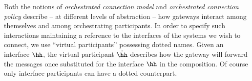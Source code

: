 %		  
%		  

Both the notions of {\em orchestrated connection model} and {\em orchestrated connection policy}
describe -- at different levels of abstraction -- how gateways interact among themselves and among orchestrating participants.
In order to specify such interactions maintaining a reference to the interfaces of the systems 
we wish to connect,
we use ``virtual participants'' possessing dotted names. Given an interface $\hh$, the
virtual participant $\dot\hh$ describes how the gateway will forward the messages
once substituted for the interface $\hh$ in the composition. Of course only interface participants can have a dotted counterpart. \\



